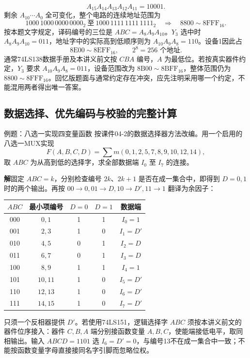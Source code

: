 \documentclass[UTF8,fontset=none,zihao=-4,a4paper]{ctexart}
\newcommand{\sol}{\par\noindent\textbf{解}\quad}
\begin{document}
\[
A_{15}A_{14}A_{13}A_{12}A_{11}=10001.
\]
剩余 $A_{10}\cdots A_0$ 全可变化，整个电路的连续地址范围为
\[
1000\,1000\,0000\,0000_2\ \text{至}\ 1000\,1111\,1111\,1111_2
\quad\Longrightarrow\quad \mathrm{8800\!\sim\!8FFF}_{16}.
\]
按本题文字规定，译码编号的三位是 $ABC=A_8A_9A_{10}$。$Y_3$ 选中时 $A_8A_9A_{10}=011$，地址字中的实际高到低顺序则为 $A_{10}A_9A_8=110$。设备1因此占
\[
\mathrm{8E00\!\sim\!8EFF}_{16},\qquad 2^8=256\text{ 个地址}.
\]
通常74LS138数据手册及本讲义前文按 $CBA$ 编号，$A$ 为最低位。若按真实器件约定，$Y_3$ 要求 $A_{10}A_9A_8=011$，设备范围改为 $\mathrm{8B00\!\sim\!8BFF}_{16}$，整体范围仍为 $\mathrm{8800\!\sim\!8FFF}_{16}$。回忆版题面与通常约定存在冲突，应先注明采用哪一个约定，不能混用两者得出唯一答案。

\subsection{数据选择、优先编码与校验的完整计算}
\begin{infobox}{例题：八选一实现四变量函数}
按课件04-2的数据选择器方法改编。用一个启用的八选一MUX实现
\[
F(A,B,C,D)=\sum m(0,1,2,5,7,8,9,10,12,14),
\]
取 $ABC$ 为从高到低的选择字，求全部数据端 $I_0$ 至 $I_7$ 的连接。
\end{infobox}
\sol 固定 $ABC=k$，分别检查编号 $2k$、$2k+1$ 是否在成一集合中，即得到 $D=0,1$ 时的两个输出。再按 $00\to0,01\to D,10\to D',11\to1$ 翻译为余因子：
\begin{center}
\begin{tabular}{c c cc c}
\toprule $ABC$&最小项编号&$D=0$&$D=1$&数据端\\\midrule
000&$0,1$&1&1&$I_0=1$\\
001&$2,3$&1&0&$I_1=D'$\\
010&$4,5$&0&1&$I_2=D$\\
011&$6,7$&0&1&$I_3=D$\\
100&$8,9$&1&1&$I_4=1$\\
101&$10,11$&1&0&$I_5=D'$\\
110&$12,13$&1&0&$I_6=D'$\\
111&$14,15$&1&0&$I_7=D'$\\\bottomrule
\end{tabular}
\end{center}
只须一个反相器提供 $D'$。若使用74LS151，逻辑选择字 $ABC$ 须按本讲义前文的器件位序接入：器件 $C,B,A$ 端分别接函数变量 $A,B,C$，使能端接低电平，取同相输出。输入 $ABCD=1101$ 选 $I_6=D'=0$，与编号13不在成一集合中一致；不能按函数变量字母直接接同名字引脚而忽略位权。
\end{document}
